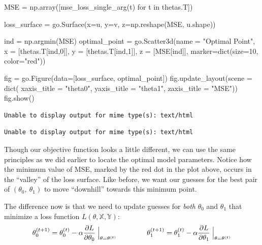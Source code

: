 \documentclass[
  letterpaper,
  DIV=11,
  numbers=noendperiod]{scrreprt}
\newenvironment{Shaded}{\begin{snugshade}}{\end{snugshade}}
\newcommand{\BuiltInTok}[1]{\textcolor[rgb]{0.00,0.23,0.31}{#1}}
\newcommand{\ControlFlowTok}[1]{\textcolor[rgb]{0.00,0.23,0.31}{#1}}
\newcommand{\DecValTok}[1]{\textcolor[rgb]{0.68,0.00,0.00}{#1}}
\newcommand{\KeywordTok}[1]{\textcolor[rgb]{0.00,0.23,0.31}{#1}}
\newcommand{\NormalTok}[1]{\textcolor[rgb]{0.00,0.23,0.31}{#1}}
\newcommand{\OperatorTok}[1]{\textcolor[rgb]{0.37,0.37,0.37}{#1}}
\newcommand{\StringTok}[1]{\textcolor[rgb]{0.13,0.47,0.30}{#1}}
\begin{document}
\begin{Shaded}
\begin{Highlighting}[]
\NormalTok{MSE }\OperatorTok{=}\NormalTok{ np.array([mse\_loss\_single\_arg(t) }\ControlFlowTok{for}\NormalTok{ t }\KeywordTok{in}\NormalTok{ thetas.T])}

\NormalTok{loss\_surface }\OperatorTok{=}\NormalTok{ go.Surface(x}\OperatorTok{=}\NormalTok{u, y}\OperatorTok{=}\NormalTok{v, z}\OperatorTok{=}\NormalTok{np.reshape(MSE, u.shape))}

\NormalTok{ind }\OperatorTok{=}\NormalTok{ np.argmin(MSE)}
\NormalTok{optimal\_point }\OperatorTok{=}\NormalTok{ go.Scatter3d(name }\OperatorTok{=} \StringTok{"Optimal Point"}\NormalTok{,}
\NormalTok{    x }\OperatorTok{=}\NormalTok{ [thetas.T[ind,}\DecValTok{0}\NormalTok{]], y }\OperatorTok{=}\NormalTok{ [thetas.T[ind,}\DecValTok{1}\NormalTok{]], }
\NormalTok{    z }\OperatorTok{=}\NormalTok{ [MSE[ind]],}
\NormalTok{    marker}\OperatorTok{=}\BuiltInTok{dict}\NormalTok{(size}\OperatorTok{=}\DecValTok{10}\NormalTok{, color}\OperatorTok{=}\StringTok{"red"}\NormalTok{))}

\NormalTok{fig }\OperatorTok{=}\NormalTok{ go.Figure(data}\OperatorTok{=}\NormalTok{[loss\_surface, optimal\_point])}
\NormalTok{fig.update\_layout(scene }\OperatorTok{=} \BuiltInTok{dict}\NormalTok{(}
\NormalTok{    xaxis\_title }\OperatorTok{=} \StringTok{"theta0"}\NormalTok{,}
\NormalTok{    yaxis\_title }\OperatorTok{=} \StringTok{"theta1"}\NormalTok{,}
\NormalTok{    zaxis\_title }\OperatorTok{=} \StringTok{"MSE"}\NormalTok{))}
\NormalTok{fig.show()}
\end{Highlighting}
\end{Shaded}

\begin{verbatim}
Unable to display output for mime type(s): text/html
\end{verbatim}

\begin{verbatim}
Unable to display output for mime type(s): text/html
\end{verbatim}

Though our objective function looks a little different, we can use the
same principles as we did earlier to locate the optimal model
parameters. Notice how the minimum value of MSE, marked by the red dot
in the plot above, occurs in the ``valley'' of the loss surface. Like
before, we want our guesses for the best pair of
\((\theta_0,\:\theta_1)\) to move ``downhill'' towards this minimum
point.

The difference now is that we need to update guesses for \emph{both}
\(\theta_0\) and \(\theta_1\) that minimize a loss function
\(L(\theta, \mathbb{X}, \mathbb{Y})\):
\[\theta_0^{(t+1)} = \theta_0^{(t)} - \alpha \frac{\partial L}{\partial \theta_0}\Bigm\vert_{\theta=\theta^{(t)}} \qquad \qquad \theta_1^{(t+1)} = \theta_1^{(t)} - \alpha \frac{\partial L}{\partial \theta_1}\Bigm\vert_{\theta=\theta^{(t)}}\]
\end{document}
